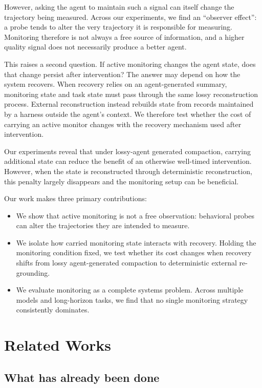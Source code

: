 \documentclass{article}
\begin{document}
However, asking the agent to maintain such a signal can itself change the trajectory being measured. Across our experiments, we find an ``observer effect'': a probe tends to alter the very trajectory it is responsible for measuring. Monitoring therefore is not always a free source of information, and a higher quality signal does not necessarily produce a better agent.

This raises a second question. If active monitoring changes the agent state, does that change persist after intervention? The answer may depend on how the system recovers. When recovery relies on an agent-generated summary, monitoring state and task state must pass through the same lossy reconstruction process. External reconstruction instead rebuilds state from records maintained by a harness outside the agent's context. We therefore test whether the cost of carrying an active monitor changes with the recovery mechanism used after intervention.

Our experiments reveal that under lossy-agent generated compaction, carrying additional state can reduce the benefit of an otherwise well-timed intervention. However, when the state is reconstructed through deterministic reconstruction, this penalty largely disappears and the monitoring setup can be beneficial.

Our work makes three primary contributions:
\begin{itemize}
  \item We show that active monitoring is not a free observation: behavioral probes can alter the trajectories they are intended to measure.
  \item We isolate how carried monitoring state interacts with recovery. Holding the monitoring condition fixed, we test whether its cost changes when recovery shifts from lossy agent-generated compaction to deterministic external re-grounding.
  \item We evaluate monitoring as a complete systems problem. Across multiple models and long-horizon tasks, we find that no single monitoring strategy consistently dominates.
\end{itemize}

\section{Related Works}

\subsection{What has already been done}
\end{document}
